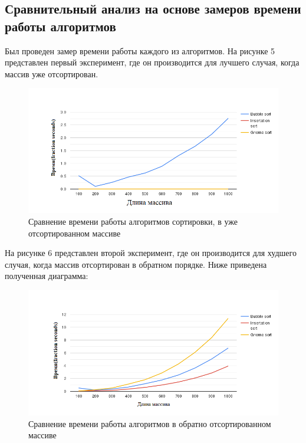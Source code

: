 \documentclass[a4paper, 12pt]{article}
\begin{document}
\begin{flushleft}
	\subsection{Сравнительный анализ на основе замеров времени работы алгоритмов}
	Был проведен замер времени работы каждого из алгоритмов.
	\clearpage
	\newpage
	\hspace*{5mm} На рисунке 5 представлен первый эксперимент, где он производится для лучшего случая, когда массив уже отсортирован.
	\begin{figure}[h]
		\centering \includegraphics[scale=2.1]{sorted}
		\centering\caption{Сравнение времени работы алгоритмов сортировки, в уже отсортированном массиве}
	\end{figure}
	\clearpage
	\newpage
	\hspace*{5mm} На рисунке 6 представлен второй эксперимент, где он производится для худшего случая, когда массив отсортирован в обратном порядке. Ниже приведена полученная диаграмма: 
	\begin{figure}[h]
		\includegraphics[scale=2.1]{reversed}
		\centering\caption{Сравнение времени работы алгоритмов в обратно отсортированном массиве}
	\end{figure}


\end{flushleft}
\end{document}
